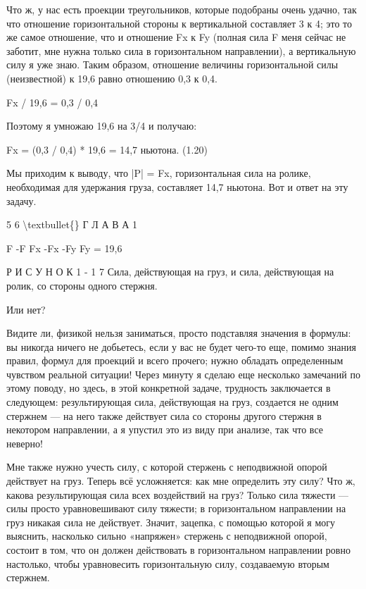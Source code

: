 \documentclass[10pt,oneside]{article}
\begin{document}
Что ж, у нас есть проекции треугольников, которые подобраны очень удачно, так что отношение горизонтальной стороны к вертикальной составляет 3 к 4; это то же самое отношение, что и отношение Fx к Fy (полная сила F меня сейчас не заботит, мне нужна только сила в горизонтальном направлении), а вертикальную силу я уже знаю. Таким образом, отношение величины горизонтальной силы (неизвестной) к 19,6 равно отношению 0,3 к 0,4.\par

Fx / 19,6 = 0,3 / 0,4\par

Поэтому я умножаю 19,6 на 3/4 и получаю:\par

Fx = (0,3 / 0,4) * 19,6 = 14,7 ньютона. (1.20)\par

Мы приходим к выводу, что |P| = Fx, горизонтальная сила на ролике, необходимая для удержания груза, составляет 14,7 ньютона. Вот и ответ на эту задачу.\par

5 6 \textbackslash{}textbullet\{\} Г Л А В А  1\par

F -F Fx -Fx -Fy Fy = 19,6\par

Р И С У Н О К  1 - 1 7 Сила, действующая на груз, и сила, действующая на ролик, со стороны одного стержня.\par

Или нет?\par

Видите ли, физикой нельзя заниматься, просто подставляя значения в формулы: вы никогда ничего не добьетесь, если у вас не будет чего-то еще, помимо знания правил, формул для проекций и всего прочего; нужно обладать определенным чувством реальной ситуации! Через минуту я сделаю еще несколько замечаний по этому поводу, но здесь, в этой конкретной задаче, трудность заключается в следующем: результирующая сила, действующая на груз, создается не одним стержнем --- на него также действует сила со стороны другого стержня в некотором направлении, а я упустил это из виду при анализе, так что все неверно!\par

Мне также нужно учесть силу, с которой стержень с неподвижной опорой действует на груз. Теперь всё усложняется: как мне определить эту силу? Что ж, какова результирующая сила всех воздействий на груз? Только сила тяжести --- силы просто уравновешивают силу тяжести; в горизонтальном направлении на груз никакая сила не действует. Значит, зацепка, с помощью которой я могу выяснить, насколько сильно «напряжен» стержень с неподвижной опорой, состоит в том, что он должен действовать в горизонтальном направлении ровно настолько, чтобы уравновесить горизонтальную силу, создаваемую вторым стержнем.\par
\end{document}
